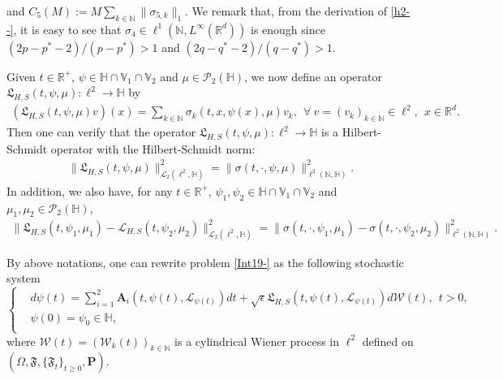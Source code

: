 \documentclass[11pt]{article}
\renewcommand{\geq}{\geqslant}  %
\numberwithin{equation}{section}
\begin{document}
and $C_5(M):=M\sum_{k\in\mathbb{N}}
\|\sigma_{5,k}\|_{1}$. We remark that, from the derivation of \eqref{h2--}, it is easy to see that $\sigma_4\in
 \ell^{1}
 (\mathbb{N},L^{\infty}
 (\mathbb{R}^d))$ is enough since $(2p-p^*-2)/ (p-p^*)>1$ and $(2q-q^*-2)/(q-q^*)>1$.


Given $t\in\mathbb{R}^+$, $\psi\in\mathbb{H}\cap \mathbb{V}_1 \cap \mathbb{V}_2$ and $\mu
\in\mathcal{P}_2(\mathbb{H})$, we now define an operator
$\mathfrak{L}_{H,S}(t,\psi,\mu):\ell^2\rightarrow \mathbb{H}$ by
\begin{align}\label{jhjfjnfhh}
(\mathfrak{L}_{H,S}(t,\psi,\mu)v)(x)
= \sum_{k\in\mathbb{N}}\sigma_{k}(t,x, \psi(x),\mu)v_k
,\ \ \forall\ v=(v_k)_{k\in \mathbb{N}}\in \ell^2,\ \ x\in \mathbb{R}^d.
\end{align}
Then one can verify that the operator
$\mathfrak{L}_{H,S}(t,\psi,\mu):\ell^2\rightarrow \mathbb{H}$ is
 a Hilbert-Schmidt operator with the Hilbert-Schmidt norm:
\begin{align}\label{ffnewA2a0}
\|\mathfrak{L}_{H,S}(t,\psi,\mu)
\|^2_{\mathcal{L}_2(\ell^2
,\mathbb{H})}
 =\|\sigma(t,\cdot,\psi,\mu)
\|^2_{
\ell^2(\mathbb{N},
\mathbb{H})}.
\end{align}
 In addition, we also have, for any $t\in\mathbb{R}^+$, $\psi_1,\psi_2\in\mathbb{H}\cap \mathbb{V}_1 \cap \mathbb{V}_2$ and $\mu_1,\mu_2
\in\mathcal{P}_2(\mathbb{H})$,
\begin{align}\label{h2----0}
\|\mathfrak{L}_{H,S}(t,\psi_1,\mu_1)-
\mathcal{L}_{H,S}(t,\psi_2,\mu_2)
\|^2_{\mathcal{L}_2(\ell^2
,\mathbb{H})}=\|\sigma(t,\cdot,\psi_1,
\mu_1)-
\sigma(t,\cdot,\psi_2,\mu_2)
\|^2_{
\ell^2(\mathbb{N},
\mathbb{H})}.
\end{align}








By above notations, one can rewrite problem \eqref{Int19-} as the following stochastic system
\begin{equation}\label{Int1--}
\left\{
  \begin{aligned}
  &d \psi(t)
=\sum_{i=1}^2\textbf{A}_i(t,\psi(t),\mathcal{L}_{
\psi(t)})dt
+ \sqrt{\epsilon}\mathfrak{L}_{H,S}(t,\psi(t),
\mathcal{L}_{
\psi(t)})d\mathcal{W}(t), \ \ t>0, \\
  &\psi(0)=\psi_0\in \mathbb{H},\\
  \end{aligned}
\right.
\end{equation}
where $\mathcal{W}(t)=(\mathcal{W}_{k}(t))_{k\in\mathbb{N}}$ is a cylindrical Wiener process
in $\ell^2$ defined on
$(\Omega,\mathfrak{F},
 \{\mathfrak{F}_t\}_{t\geq0},\textbf{P})$.
\end{document}
